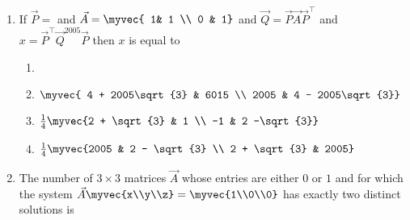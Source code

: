 \begin{enumerate}
\begin{enumerate}
        \end{enumerate}
%
    \item If $\vec{P}=$ 
         and $\vec{A} = \myvec{ 1& 1 \\ 0 & 1}$ and $\vec{Q} = \vec{P}\vec{A}\vec{P}^{\top}$ and $x=\vec{P}^{\top}\vec{Q}^{2005}\vec{P}$ then $x$ is equal to 
%
            \begin{enumerate}
                \item {}
                \item $\myvec{ 4 + 2005\sqrt{3} & 6015 \\ 2005 & 4 - 2005\sqrt{3}}$
                \item $\frac{1}{4}\myvec{2 + \sqrt{3} & 1 \\ -1 & 2 -\sqrt{3}}$
                \item $\frac{1}{4}\myvec{2005 & 2 - \sqrt{3} \\ 2 + \sqrt{3} & 2005}$
            \end{enumerate}		
            \item The number of $3 \times 3$ matrices $\vec{A}$ whose entries are either $0$ or $1$ and for which the system $\vec{A}\myvec{x\\y\\z}=\myvec{1\\0\\0}$ has exactly two distinct solutions is \hfill{}
%
                \begin{enumerate}
\end{enumerate}
\end{enumerate}
